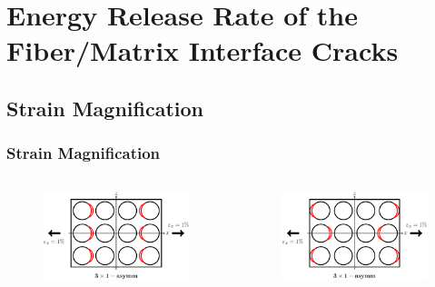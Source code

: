 \documentclass[first,firstsupp,lastsupp,last,hyperref,table]{ETHclass}
\begin{document}
\section[Debond ERR]{Energy Release Rate of the Fiber/Matrix Interface Cracks}

\subsection{Strain Magnification}

\begin{frame}
\frametitle{\vspace{0.2cm}\small Strain Magnification}
\vspace{-1cm}
\centering
\begin{columns}[c]
\centering
\begin{column}{0.5\textwidth}
\centering
\begin{figure}
\centering
\includegraphics[width=0.75\columnwidth]{twofibers-sameside-strainmagni3.pdf}
\end{figure}
\end{column}
\begin{column}{0.5\textwidth}
\centering
\begin{figure}
\centering
\includegraphics[width=0.75\columnwidth]{twofibers-oppositeside-strainmagni3.pdf}
\end{figure}
\end{column}

\end{columns}
\end{frame}
\end{document}
